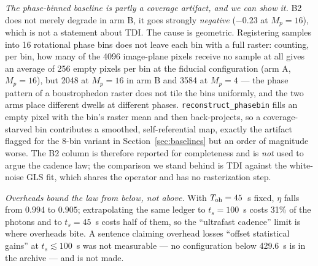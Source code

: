 \documentclass[twocolumn,10pt]{article}
\begin{document}
\emph{The phase-binned baseline is partly a coverage artifact, and we can
show it.} B2 does not merely degrade in arm B, it goes strongly
\emph{negative} ($-0.23$ at $M_p=16$), which is not a statement about TDI. The
cause is geometric. Registering samples into 16 rotational phase bins does not
leave each bin with a full raster: counting, per bin, how many of the 4096
image-plane pixels receive no sample at all gives an average of 256 empty
pixels per bin at the fiducial configuration (arm A, $M_p=16$), but 2048 at
$M_p=16$ in arm B and 3584 at $M_p=4$ --- the phase pattern of a
boustrophedon raster does not tile the bins uniformly, and the two arms place
different dwells at different phases. \texttt{reconstruct\_phasebin} fills an
empty pixel with the bin's raster mean and then back-projects, so a
coverage-starved bin contributes a smoothed, self-referential map, exactly the
artifact flagged for the 8-bin variant in Section~\ref{sec:baselines} but an
order of magnitude worse. The B2 column is therefore reported for
completeness and is \emph{not} used to argue the cadence law; the comparison we
stand behind is TDI against the white-noise GLS fit, which shares the operator
and has no rasterization step.

\emph{Overheads bound the law from below, not above.} With
$T_{\rm oh}=45$~s fixed, $\eta$ falls from $0.994$ to $0.905$; extrapolating
the same ledger to $t_s=100$~s costs 31\% of the photons and to $t_s=45$~s
costs half of them, so the ``ultrafast cadence'' limit is where overheads bite.
A sentence claiming overhead losses ``offset statistical gains'' at
$t_s\lesssim100$~s was not measurable --- no configuration below 429.6~s is in
the archive --- and is not made.

\begin{table}[t]
\centering
\caption{Effective number of independent looks,
$N_{\rm eff}=M_p^2/(M_p+2\sum_{k\ge1}(M_p-k)\rho_k)$ with
$\rho_k=e^{-k\Delta t/\tau_{\rm cloud}}$ and per-pass revisit spacing
$\Delta t=256(t_s+45)/86{,}400$~d (tabulated for Arm A, with $t_s=7200, 3600, 1800, 900, 450$~s; for Arm B, the corresponding dwells yield closely matching values, e.g., $N_{\rm eff}=11.64$ at $M_p=64$ for $\tau=4$~d).}
\label{tab:neff}
\footnotesize
\setlength{\tabcolsep}{4pt}
\end{table}
\end{document}
